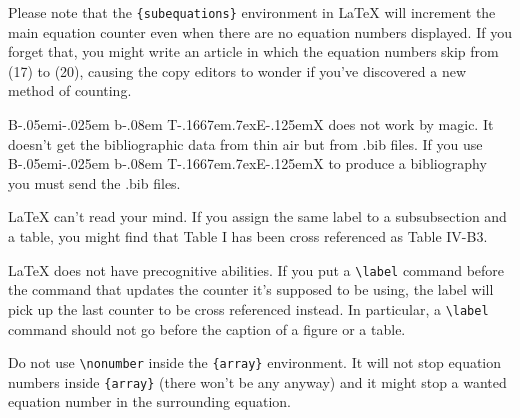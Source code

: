 \documentclass[conference]{IEEEtran}
\def\BibTeX{{\rm B\kern-.05em{\sc i\kern-.025em b}\kern-.08em
    T\kern-.1667em\lower.7ex\hbox{E}\kern-.125emX}}
\begin{document}
Please note that the \verb|{subequations}| environment in {\LaTeX}
will increment the main equation counter even when there are no
equation numbers displayed. If you forget that, you might write an
article in which the equation numbers skip from (17) to (20), causing
the copy editors to wonder if you've discovered a new method of
counting.

{\BibTeX} does not work by magic. It doesn't get the bibliographic
data from thin air but from .bib files. If you use {\BibTeX} to
produce a bibliography you must send the .bib files.

{\LaTeX} can't read your mind. If you assign the same label to a
subsubsection and a table, you might find that Table I has been cross
referenced as Table IV-B3.

{\LaTeX} does not have precognitive abilities. If you put a
\verb|\label| command before the command that updates the counter it's
supposed to be using, the label will pick up the last counter to be
cross referenced instead. In particular, a \verb|\label| command
should not go before the caption of a figure or a table.

Do not use \verb|\nonumber| inside the \verb|{array}| environment. It
will not stop equation numbers inside \verb|{array}| (there won't be
any anyway) and it might stop a wanted equation number in the
surrounding equation.
\end{document}
